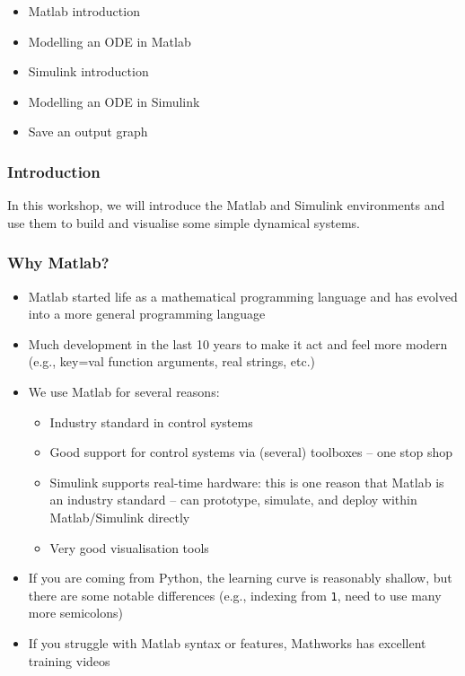 \documentclass[9pt]{beamer-control}
\begin{document}

\begin{SUMMARY}
\begin{itemize}
\item Matlab introduction
\item Modelling an ODE in Matlab
\item Simulink introduction
\item Modelling an ODE in Simulink
\item Save an output graph
\end{itemize}
\end{SUMMARY}


\begin{frame}
\frametitle{Introduction}
In this workshop, we will introduce the Matlab and Simulink environments and use them to build and visualise some simple dynamical systems.
\end{frame}


\begin{frame}
\frametitle{Why Matlab?}
\begin{itemize}
\item Matlab started life as a mathematical programming language and has evolved into a more general programming language
\item Much development in the last 10 years to make it act and feel more modern (e.g., key=val function arguments, real strings, etc.)
\item We use Matlab for several reasons:
\begin{itemize}
\item  Industry standard in control systems
\item  Good support for control systems via (several) toolboxes -- one stop shop
\item  Simulink supports real-time hardware: this is one reason that Matlab is an industry standard -- can prototype, simulate, and deploy within Matlab/Simulink directly
\item  Very good visualisation tools
\end{itemize}
\item If you are coming from Python, the learning curve is reasonably shallow, but there are some notable differences (e.g., indexing from \texttt{1}, need to use many more semicolons)
\item If you struggle with Matlab syntax or features, Mathworks has excellent training videos
\end{itemize}
\end{frame}
\end{document}
